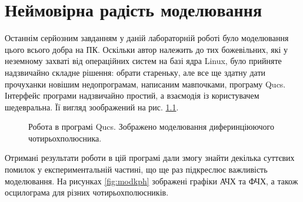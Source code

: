 \chapter{Неймовірна радість моделювання} 
\label{chap:first}

Останнім серйозним завданням у даній лабораторній роботі було моделювання цього всього добра на ПК. Оскільки автор належить до тих божевільних, які у неземному захваті від операційних систем на базі ядра Linux, було прийняте надзвичайно складне рішення: обрати стареньку, але все ще здатну дати прочуханки новішим недопрограмам, написаним мавпочками, програму Qucs. Інтерфейс програми надзвичайно простий, а взаємодія із користувачем шедевральна. Її вигляд зоображений на рис. \ref{fig:qucs}.

\begin{figure}[h]
\caption{Робота в програмі Qucs. Зображено моделювання диферинціюючого чотирьохполюсника.}
\label{fig:qucs}
\end{figure}

Отримані результати роботи в цій програмі дали змогу знайти декілька суттєвих помилок у експериментальній частині, що ще раз підкреслює важливість моделювання. На рисунках \ref{fig:modkph} зображені графіки АЧХ та ФЧХ, а також осцилограма для різних чотирьохполюсників.

